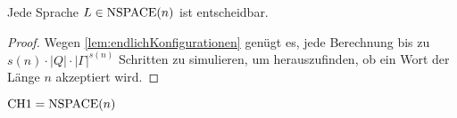 \begin{Satz}\label{satz:nspaceDecidable}
 Jede Sprache $L\in\operatorname{NSPACE}(n)$ ist entscheidbar.
\end{Satz}
\begin{proof}
 Wegen \autoref{lem:endlichKonfigurationen} genügt es, jede Berechnung bis zu
 $s(n)\cdot |Q| \cdot |\Gamma|^{s(n)}$
 Schritten zu simulieren, um herauszufinden, ob ein Wort der Länge $n$ akzeptiert wird.
\end{proof}











\begin{Satz}\label{satz:CH1IsNspace}
	$\text{CH{1}}=\operatorname{NSPACE}(n)$
\end{Satz}

